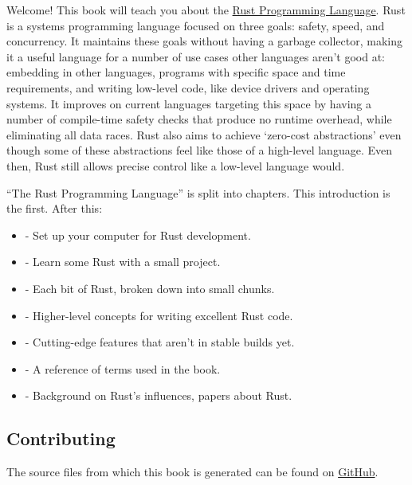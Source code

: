 Welcome! This book will teach you about the \href{https://www.rust-lang.org/}{Rust Programming Language}.
Rust is a systems programming language focused on three goals: safety, speed, and concurrency. It maintains 
these goals without having a garbage collector, making it a useful language for a number of use cases other 
languages aren’t good at: embedding in other languages, programs with specific space and time requirements, 
and writing low-level code, like device drivers and operating systems. It improves on current languages targeting 
this space by having a number of compile-time safety checks that produce no runtime overhead, while eliminating 
all data races. Rust also aims to achieve ‘zero-cost abstractions’ even though some of these abstractions feel 
like those of a high-level language. Even then, Rust still allows precise control like a low-level language would.

\blank
\enquote{The Rust Programming Language} is split into chapters. This introduction is the first. After this:

\begin{itemize}
    \item{ - Set up your computer for Rust development.}
    \item{ - Learn some Rust with a small project.}
    \item{ - Each bit of Rust, broken down into small chunks.}
    \item{ - Higher-level concepts for writing excellent Rust code.}
    \item{ - Cutting-edge features that aren’t in stable builds yet.}
    \item{ - A reference of terms used in the book.}
    \item{ - Background on Rust's influences, papers about Rust.}
\end{itemize}

\subsection*{Contributing}

The source files from which this book is generated can be found on
\href{https://github.com/rust-lang/rust/tree/master/src/doc/book}{GitHub}.